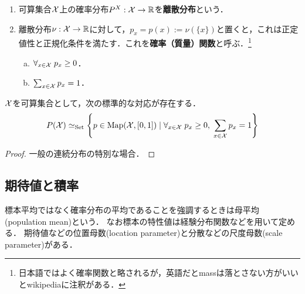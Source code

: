 \documentclass[uplatex,dvipdfmx]{jsreport}
\begin{document}
\begin{definition}\mbox{}
    \begin{enumerate}
        \item 可算集合$\mathcal{X}$上の確率分布$P^X:\mathcal{X}\to\mathbb{R}$を\textbf{離散分布}という．
        \item 離散分布$\nu:\mathcal{X}\to\mathbb{R}$に対して，$p_x=p(x):=\nu(\{x\})$と置くと，これは正定値性と正規化条件を満たす．これを\textbf{確率（質量）関数}と呼ぶ．\footnote{日本語ではよく確率関数と略されるが，英語だとmassは落とさない方がいいとwikipediaに注釈がある．}
        \begin{enumerate}[(a)]
            \item $\forall_{x\in\mathcal{X}}\;p_x\ge 0$．
            \item $\sum_{x\in\mathcal{X}}p_x=1$．
        \end{enumerate}
    \end{enumerate}
\end{definition}

\begin{lemma}
    $\mathcal{X}$を可算集合として，次の標準的な対応が存在する．
    \[P(\mathcal{X})\simeq_{\mathrm{Set}}\left\{p\in\mathrm{Map}(\mathcal{X},[0,1])\mid\forall_{x\in\mathcal{X}}\;p_x\ge 0,\;\sum_{x\in\mathcal{X}}p_x=1\right\}\]
\end{lemma}
\begin{proof}
    一般の連続分布の特別な場合．
\end{proof}

\subsection{期待値と積率}

\begin{tcolorbox}[colframe=ForestGreen, colback=ForestGreen!10!white,breakable,colbacktitle=ForestGreen!40!white,coltitle=black,fonttitle=\bfseries\sffamily,
title=]
    標本平均ではなく確率分布の平均であることを強調するときは母平均(population mean)という．
    なお標本の特性値は経験分布関数などを用いて定める．
    期待値などの位置母数(location parameter)と分散などの尺度母数(scale parameter)がある．
\end{tcolorbox}
\end{document}
